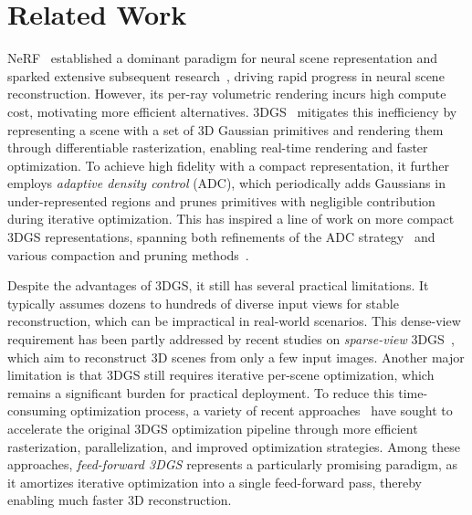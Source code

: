 \section{Related Work}
\vspace{-5pt}
NeRF~\cite{mildenhall2021nerf} established a dominant paradigm for neural scene representation and sparked extensive subsequent research~\cite{martin2021nerf, barron2021mip, barron2022mip, yu2021plenoctrees, muller2022instant, fridovich2022plenoxels, park2021nerfies, barron2023zip, chen2022tensorf}, driving rapid progress in neural scene reconstruction. However, its per-ray volumetric rendering incurs high compute cost, motivating more efficient alternatives.
3DGS~\cite{kerbl20233dgs} mitigates this inefficiency by representing a scene with a set of 3D Gaussian primitives and rendering them through differentiable rasterization, enabling real-time rendering and faster optimization.
To achieve high fidelity with a compact representation, it further employs \textit{adaptive density control} (ADC), which periodically adds Gaussians in under-represented regions and prunes primitives with negligible contribution during iterative optimization.
This has inspired a line of work on more compact 3DGS representations, spanning both refinements of the ADC strategy~\cite{ye2024absgs, rota2024revising, zhang2024pixel, kim2024color, kheradmand20243d, cheng2024gaussianpro, zhang2024fregs, grubert2025improving, fang2024mini, mallick2024taming} 
and various compaction and pruning methods~\cite{lee2024compact, niedermayr2024compressed, papantonakis2024reducing, fan2024lightgaussian, girish2024eagles, chen2024hac, wang2024end, yang2024spectrally}.

Despite the advantages of 3DGS, it still has several practical limitations. It typically assumes dozens to hundreds of diverse input views for stable reconstruction, which can be impractical in real-world scenarios. This dense-view requirement has been partly addressed by recent studies on \textit{sparse-view} 3DGS~\cite{xiong2023sparsegs, zhang2024cor, zhu2024fsgs, li2024dngaussian, he2025see, kong2025generative}, which aim to reconstruct 3D scenes from only a few input images. 
Another major limitation is that 3DGS still requires iterative per-scene optimization, which remains a significant burden for practical deployment. To reduce this time-consuming optimization process, a variety of recent approaches~\cite{feng2025flashgs, zhao2024grendel, hollein20253dgslm, chen2025dashgaussian, wang2025grouptraining3dgs} have sought to accelerate the original 3DGS optimization pipeline through more efficient rasterization, parallelization, and improved optimization strategies. Among these approaches, \textit{feed-forward 3DGS} represents a particularly promising paradigm, as it amortizes iterative optimization into a single feed-forward pass, thereby enabling much faster 3D reconstruction.

